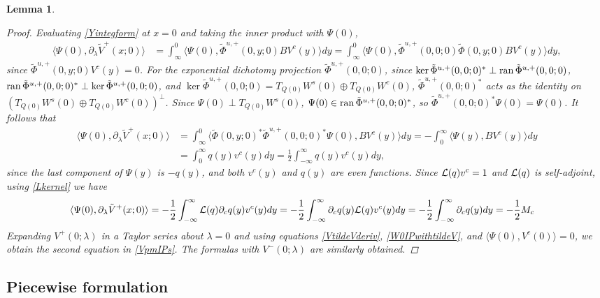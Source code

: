 \documentclass[10pt,reqno]{amsart}
\theoremstyle{plain}
\newtheorem{lemma}[theorem]{Lemma}
\theoremstyle{definition}
\theoremstyle{remark}
\numberwithin{theorem}{section}
\numberwithin{equation}{section}
\begin{document}
\begin{lemma}
\begin{proof}
Evaluating \cref{Yintegform} at $x = 0$ and taking the inner product with $\Psi(0)$, 
\begin{align*}
\langle \Psi(0), \partial_\lambda \tilde{V}^+(x; 0)  \rangle
&= \int_{\infty}^0 \langle \Psi(0), \tilde{\Phi}^{u,+}(0,y; 0) B V^c(y) \rangle dy
= \int_{\infty}^0 \langle \Psi(0), \tilde{\Phi}^{u,+}(0,0; 0) \tilde{\Phi}(0,y; 0) B V^c(y) \rangle dy,
\end{align*}
since $\tilde{\Phi}^{u,+}(0,y; 0) V^c(y) = 0$. For the exponential dichotomy projection $\tilde{\Phi}^{u,+}(0,0; 0)$, since $\mathop\mathrm{ker}\nolimits \tilde{\Phi}^{u,+}(0, 0; 0)^* \perp \operatorname{ran} \tilde{\Phi}^{u,+}(0, 0; 0)$, $\operatorname{ran} \tilde{\Phi}^{u,+}(0, 0; 0)^* \perp \mathop\mathrm{ker}\nolimits \tilde{\Phi}^{u,+}(0, 0; 0)$, and $\ker \tilde{\Phi}^{u,+}(0, 0; 0) = T_{Q(0)} W^s(0) \oplus T_{Q(0)} W^c(0)$, $\tilde{\Phi}^{u,+}(0, 0; 0)^*$ acts as the identity on $(T_{Q(0)} W^s(0) \oplus T_{Q(0)} W^c(0))^\perp$. Since $\Psi(0) \perp T_{Q(0)} W^s(0)$, $\Psi(0) \in \operatorname{ran} \tilde{\Phi}^{u,+}(0, 0; 0)^*$, so $\tilde{\Phi}^{u,+}(0, 0; 0)^* \Psi(0) = \Psi(0)$. It follows that
\begin{align*}
\langle \Psi(0), \partial_\lambda \tilde{V}^+(x; 0)  \rangle
&= \int_{\infty}^0 \langle \tilde{\Phi}(0,y; 0)^* \tilde{\Phi}^{u,+}(0,0; 0)^* \Psi(0), B V^c(y) \rangle dy = -\int_0^\infty \langle \Psi(y), B V^c(y) \rangle dy \\
&= \int_0^\infty q(y) v^c(y) dy = \frac{1}{2}\int_{-\infty}^\infty q(y) v^c(y) dy ,
\end{align*}
since the last component of $\Psi(y)$ is $-q(y)$, and both $v^c(y)$ and $q(y)$ are even functions. Since $\mathcal{L}(q)v^c = 1$ and $\mathcal{L}(q)$ is self-adjoint, using \cref{Lkernel} we have
\begin{align*}
\langle \Psi(0), \partial_\lambda \tilde{V}^+(x; 0) \rangle
&= -\frac{1}{2} \int_{-\infty}^\infty \mathcal{L}(q) \partial_c q(y) v^c(y) dy 
= -\frac{1}{2} \int_{-\infty}^\infty \partial_c q(y) \mathcal{L}(q) v^c(y) dy =
-\frac{1}{2} \int_{-\infty}^\infty \partial_c q(y) dy = -\frac{1}{2}M_c
\end{align*}
Expanding $V^+(0; \lambda)$ in a Taylor series about $\lambda = 0$ and using equations \cref{VtildeVderiv}, \cref{W0IPwithtildeV}, and $\langle \Psi(0), V^c(0)\rangle = 0$, we obtain the second equation in \cref{VpmIPs}. The formulas with $V^-(0; \lambda)$ are similarly obtained.
\end{proof}
\end{lemma}

\subsection{Piecewise formulation}
\end{document}
